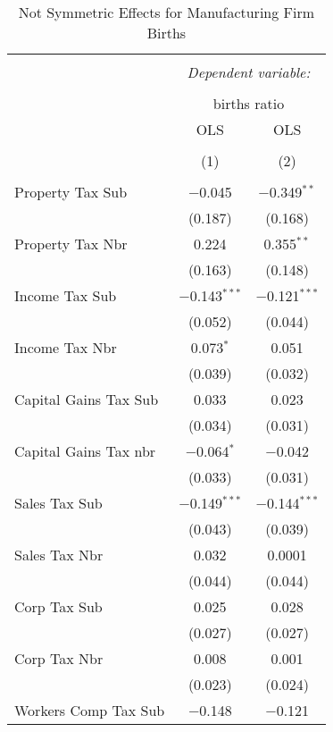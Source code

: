 
\begin{table}[!htbp] \centering 
  \caption{Not Symmetric Effects for  Manufacturing Firm Births} 
  \label{31-33noequality} 
\footnotesize 
\begin{tabular}{@{\extracolsep{5pt}}lcc} 
\\[-1.8ex]\hline 
\hline \\[-1.8ex] 
 & \multicolumn{2}{c}{\textit{Dependent variable:}} \\ 
\cline{2-3} 
\\[-1.8ex] & \multicolumn{2}{c}{births ratio} \\ 
 & OLS & OLS \\ 
\\[-1.8ex] & (1) & (2)\\ 
\hline \\[-1.8ex] 
 Property Tax Sub & $-$0.045 & $-$0.349$^{**}$ \\ 
  & (0.187) & (0.168) \\ 
  Property Tax Nbr & 0.224 & 0.355$^{**}$ \\ 
  & (0.163) & (0.148) \\ 
  Income Tax Sub & $-$0.143$^{***}$ & $-$0.121$^{***}$ \\ 
  & (0.052) & (0.044) \\ 
  Income Tax Nbr & 0.073$^{*}$ & 0.051 \\ 
  & (0.039) & (0.032) \\ 
  Capital Gains Tax Sub & 0.033 & 0.023 \\ 
  & (0.034) & (0.031) \\ 
  Capital Gains Tax nbr & $-$0.064$^{*}$ & $-$0.042 \\ 
  & (0.033) & (0.031) \\ 
  Sales Tax Sub & $-$0.149$^{***}$ & $-$0.144$^{***}$ \\ 
  & (0.043) & (0.039) \\ 
  Sales Tax Nbr & 0.032 & 0.0001 \\ 
  & (0.044) & (0.044) \\ 
  Corp Tax Sub & 0.025 & 0.028 \\ 
  & (0.027) & (0.027) \\ 
  Corp Tax Nbr & 0.008 & 0.001 \\ 
  & (0.023) & (0.024) \\ 
  Workers Comp Tax Sub & $-$0.148 & $-$0.121 \\ 

\end{tabular}
\end{table}
